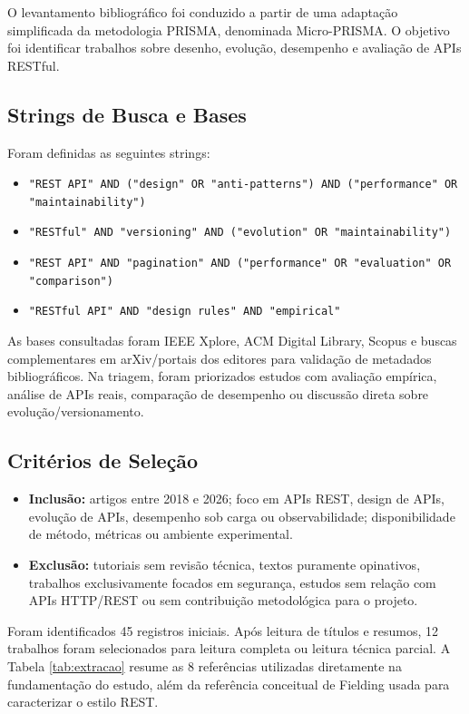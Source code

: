 \documentclass[journal]{IEEEtran}
\begin{document}
O levantamento bibliográfico foi conduzido a partir de uma adaptação simplificada da metodologia PRISMA, denominada Micro-PRISMA. O objetivo foi identificar trabalhos sobre desenho, evolução, desempenho e avaliação de APIs RESTful.

\subsection{Strings de Busca e Bases}

Foram definidas as seguintes strings:

\begin{itemize}
    \item \texttt{"REST API" AND ("design" OR "anti-patterns") AND ("performance" OR "maintainability")}
    \item \texttt{"RESTful" AND "versioning" AND ("evolution" OR "maintainability")}
    \item \texttt{"REST API" AND "pagination" AND ("performance" OR "evaluation" OR "comparison")}
    \item \texttt{"RESTful API" AND "design rules" AND "empirical"}
\end{itemize}

As bases consultadas foram IEEE Xplore, ACM Digital Library, Scopus e buscas complementares em arXiv/portais dos editores para validação de metadados bibliográficos. Na triagem, foram priorizados estudos com avaliação empírica, análise de APIs reais, comparação de desempenho ou discussão direta sobre evolução/versionamento.

\subsection{Critérios de Seleção}

\begin{itemize}
    \item \textbf{Inclusão:} artigos entre 2018 e 2026; foco em APIs REST, design de APIs, evolução de APIs, desempenho sob carga ou observabilidade; disponibilidade de método, métricas ou ambiente experimental.
    \item \textbf{Exclusão:} tutoriais sem revisão técnica, textos puramente opinativos, trabalhos exclusivamente focados em segurança, estudos sem relação com APIs HTTP/REST ou sem contribuição metodológica para o projeto.
\end{itemize}

Foram identificados 45 registros iniciais. Após leitura de títulos e resumos, 12 trabalhos foram selecionados para leitura completa ou leitura técnica parcial. A Tabela \ref{tab:extracao} resume as 8 referências utilizadas diretamente na fundamentação do estudo, além da referência conceitual de Fielding usada para caracterizar o estilo REST.
\end{document}
